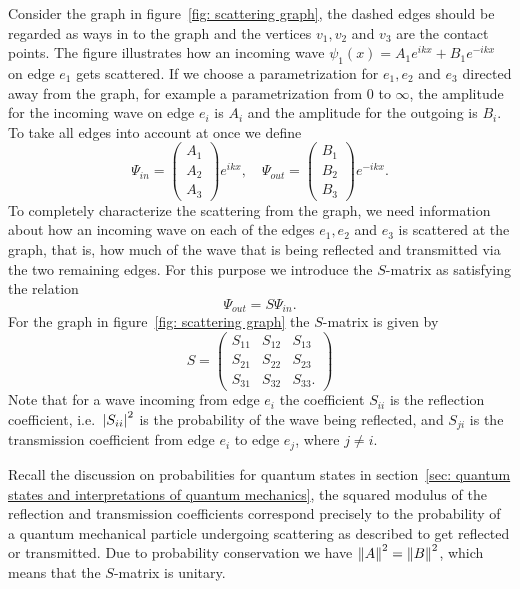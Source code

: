 Consider the graph in figure~\ref{fig: scattering graph}, the dashed edges should be regarded as ways in to the graph and the vertices $v_1, v_2$ and $v_3$ are the contact points. The figure illustrates how an incoming wave $\psi_1(x) = A_1e^{ikx}+B_1e^{-ikx}$ on edge $e_1$ gets scattered.
If we choose a parametrization for $e_1, e_2$ and $e_3$ directed away from the graph, for example a parametrization from $0$ to $\infty$, the amplitude for the incoming wave on edge $e_i$ is $A_i$ and the amplitude for the outgoing is $B_i$. To take all edges into account at once we define
\[
  \Psi_{in} =
  \begin{pmatrix}
    A_1 \\ A_2 \\ A_3
  \end{pmatrix} e^{ikx}, \quad
  \Psi_{out} =
  \begin{pmatrix}
    B_1 \\ B_2 \\ B_3
  \end{pmatrix} e^{-ikx}.
\]
To completely characterize the scattering from the graph, we need information about how an incoming wave on each of the edges $e_1, e_2$ and $e_3$ is scattered at the graph, that is, how much of the wave that is being reflected and transmitted via the two remaining edges. For this purpose we introduce the $S$-matrix as satisfying the relation
\[
  \Psi_{out} = S \Psi_{in}.
\]
For the graph in figure~\ref{fig: scattering graph} the $S$-matrix is given by
\[
  S =
  \begin{pmatrix}
    S_{11} & S_{12} & S_{13} \\
    S_{21} & S_{22} & S_{23} \\
    S_{31} & S_{32} & S_{33}.
  \end{pmatrix}
\]
Note that for a wave incoming from edge $e_i$ the coefficient $S_{ii}$ is the reflection coefficient, i.e.\ $\left\lvert S_{ii}\right\rvert^2$ is the probability of the wave being reflected, and $S_{ji}$ is the transmission coefficient from edge $e_i$ to edge $e_j$, where $j \ne i$.

Recall the discussion on probabilities for quantum states in section~\ref{sec: quantum states and interpretations of quantum mechanics}, the squared modulus of the reflection and transmission coefficients correspond precisely to the probability of a quantum mechanical particle undergoing scattering as described to get reflected or transmitted. Due to
probability conservation we have $\left\lVert A\right\rVert^2 = \left\lVert B\right\rVert^2$, which means that the $S$-matrix is unitary.


